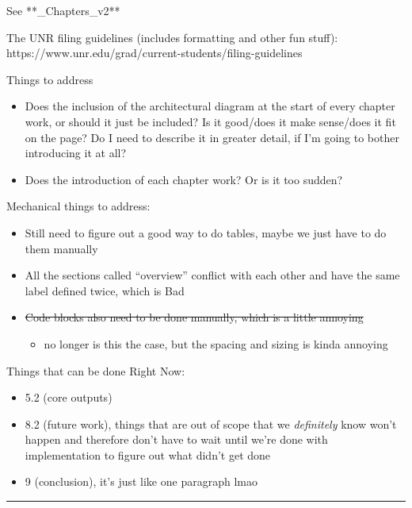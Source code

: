 See **\_Chapters\_v2**

The UNR filing guidelines (includes formatting and other fun stuff):
https://www.unr.edu/grad/current-students/filing-guidelines

Things to address

\begin{itemize}
\tightlist
\item
  Does the inclusion of the architectural diagram at the start of every
  chapter work, or should it just be included? Is it good/does it make
  sense/does it fit on the page? Do I need to describe it in greater
  detail, if I'm going to bother introducing it at all?
\item
  Does the introduction of each chapter work? Or is it too sudden?
\end{itemize}

Mechanical things to address:

\begin{itemize}
\tightlist
\item
  Still need to figure out a good way to do tables, maybe we just have
  to do them manually
\item
  All the sections called ``overview'' conflict with each other and have
  the same label defined twice, which is Bad
\item
  \st{Code blocks also need to be done manually, which is a little
  annoying}

  \begin{itemize}
  \tightlist
  \item
    no longer is this the case, but the spacing and sizing is kinda
    annoying
  \end{itemize}
\end{itemize}

Things that can be done Right Now:

\begin{itemize}
\tightlist
\item
  5.2 (core outputs)
\item
  8.2 (future work), things that are out of scope that we
  \emph{definitely} know won't happen and therefore don't have to wait
  until we're done with implementation to figure out what didn't get
  done
\item
  9 (conclusion), it's just like one paragraph lmao
\end{itemize}

\begin{center}\rule{0.5\linewidth}{0.5pt}\end{center}

